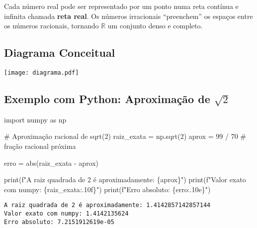 \documentclass[
  letterpaper,
  DIV=11,
  numbers=noendperiod]{scrartcl}
\newenvironment{Shaded}{\begin{snugshade}}{\end{snugshade}}
\newcommand{\BuiltInTok}[1]{\textcolor[rgb]{0.00,0.23,0.31}{#1}}
\newcommand{\CommentTok}[1]{\textcolor[rgb]{0.37,0.37,0.37}{#1}}
\newcommand{\DecValTok}[1]{\textcolor[rgb]{0.68,0.00,0.00}{#1}}
\newcommand{\ImportTok}[1]{\textcolor[rgb]{0.00,0.46,0.62}{#1}}
\newcommand{\NormalTok}[1]{\textcolor[rgb]{0.00,0.23,0.31}{#1}}
\newcommand{\OperatorTok}[1]{\textcolor[rgb]{0.37,0.37,0.37}{#1}}
\newcommand{\SpecialCharTok}[1]{\textcolor[rgb]{0.37,0.37,0.37}{#1}}
\newcommand{\SpecialStringTok}[1]{\textcolor[rgb]{0.13,0.47,0.30}{#1}}
\begin{document}
Cada número real pode ser representado por um ponto numa reta contínua e
infinita chamada \textbf{reta real}. Os números irracionais
``preenchem'' os espaços entre os números racionais, tornando
\(\mathbb{R}\) um conjunto denso e completo.

\subsection{Diagrama Conceitual}\label{diagrama-conceitual}

\begin{center}
\texttt{[image: diagrama.pdf]}
\end{center}

\subsection{\texorpdfstring{Exemplo com Python: Aproximação de
\(\sqrt{2}\)}{Exemplo com Python: Aproximação de \textbackslash sqrt\{2\}}}\label{exemplo-com-python-aproximauxe7uxe3o-de-sqrt2}

\begin{Shaded}
\begin{Highlighting}[]
\ImportTok{import}\NormalTok{ numpy }\ImportTok{as}\NormalTok{ np}

\CommentTok{\# Aproximação racional de sqrt(2)}
\NormalTok{raiz\_exata }\OperatorTok{=}\NormalTok{ np.sqrt(}\DecValTok{2}\NormalTok{)}
\NormalTok{aprox }\OperatorTok{=} \DecValTok{99} \OperatorTok{/} \DecValTok{70}  \CommentTok{\# fração racional próxima}

\NormalTok{erro }\OperatorTok{=} \BuiltInTok{abs}\NormalTok{(raiz\_exata }\OperatorTok{{-}}\NormalTok{ aprox)}

\BuiltInTok{print}\NormalTok{(}\SpecialStringTok{f"A raiz quadrada de 2 é aproximadamente: }\SpecialCharTok{\{}\NormalTok{aprox}\SpecialCharTok{\}}\SpecialStringTok{"}\NormalTok{)}
\BuiltInTok{print}\NormalTok{(}\SpecialStringTok{f"Valor exato com numpy: }\SpecialCharTok{\{}\NormalTok{raiz\_exata}\SpecialCharTok{:.10f\}}\SpecialStringTok{"}\NormalTok{)}
\BuiltInTok{print}\NormalTok{(}\SpecialStringTok{f"Erro absoluto: }\SpecialCharTok{\{}\NormalTok{erro}\SpecialCharTok{:.10e\}}\SpecialStringTok{"}\NormalTok{)}
\end{Highlighting}
\end{Shaded}

\begin{verbatim}
A raiz quadrada de 2 é aproximadamente: 1.4142857142857144
Valor exato com numpy: 1.4142135624
Erro absoluto: 7.2151912619e-05
\end{verbatim}
\end{document}
